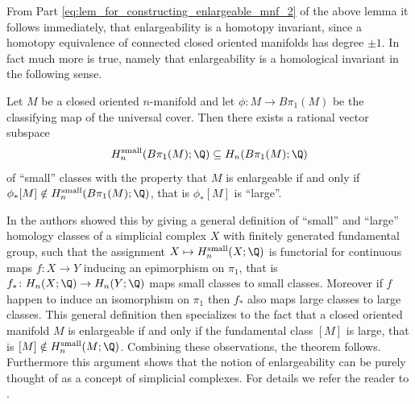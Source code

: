 From Part \ref{eq:lem_for_constructing_enlargeable_mnf_2} of the above lemma it follows immediately, that enlargeability is a homotopy invariant, since a homotopy equivalence of connected closed oriented manifolds has degree $\pm 1$. In fact much more is true, namely that enlargeability is a homological invariant in the following sense. 

\begin{theorem}
    Let $M$ be a closed oriented $n$-manifold and let $\phi \colon M \to B\pi_1(M)$ be the classifying map of the universal cover. Then there exists a rational vector subspace 
    \[
    H_n^\mathrm{small}(B\pi_1(M);\Q) \subseteq H_n(B\pi_1(M);\Q)
    \]
    of ``small'' classes with the property that $M$ is enlargeable if and only if $\phi_\ast [M] \notin H_n^\mathrm{small}(B\pi_1(M);\Q)$, that is $\phi_\ast [M]$ is ``large''.
\end{theorem}
 In \cite{BrunnbauerHanke} the authors showed this by giving a general definition of ``small'' and ``large'' homology classes of a simplicial complex $X$ with finitely generated fundamental group, such that the assignment $X \mapsto H_n^\mathrm{small}(X;\Q)$ is functorial for continuous maps $f \colon X \to Y$ inducing an epimorphism on $\pi_1$, that is $f_\ast \colon H_n(X;\Q) \to H_n(Y;\Q)$ maps small classes to small classes. Moreover if $f$ happen to induce an isomorphism on $\pi_1$ then $f_\ast$ also maps large classes to large classes. This general definition then specializes to the fact that a closed oriented manifold $M$ is enlargeable if and only if the fundamental class $[M]$ is large, that is $[M] \notin H_n^\mathrm{small}(M;\Q)$. Combining these observations, the theorem follows. Furthermore this argument shows that the notion of enlargeability can be purely thought of as a concept of simplicial complexes. For details we refer the reader to \cite{BrunnbauerHanke}.

